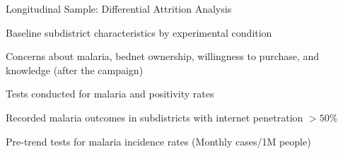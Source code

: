 \begin{table}[h!]
    \centering
    \caption{Longitudinal Sample: Differential Attrition Analysis} 
     \footnotesize
    
    \label{tab:panel_attrition_by_arm}
\end{table}







\begin{table}[h!]
    \centering
    \caption{Baseline subdistrict characteristics by experimental condition} 
     \footnotesize
    
    \label{tab:subdistricts_balance}
\end{table}





\begin{table}[h!]
    \centering
    \caption{Concerns about malaria, bednet ownership, willingness to purchase, and knowledge (after the campaign) }
        \begin{minipage}{16cm}
\end{minipage}
    \footnotesize
    
    \label{tab:treat_buy_net_xsection_ols}
\end{table}






\begin{table}[h!]
    \centering
    \caption{Tests conducted for malaria and positivity rates}
    \footnotesize
    
    \label{tab:tests}
\end{table}

\begin{table}[h!]
    \centering
    \caption{Recorded malaria outcomes in subdistricts with internet penetration $>50\%$}
    \footnotesize
    
    \label{tab:incidence_dd_byinternet}
\end{table}




\begin{table}[h!]
    \centering
    \caption{Pre-trend tests for malaria incidence rates (Monthly cases/1M people)}
    \footnotesize
    
    \label{tab:pretrend_checks}
\end{table}









